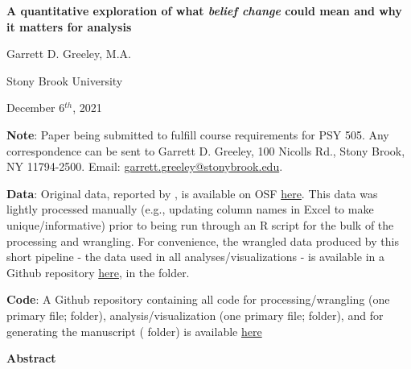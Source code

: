 \documentclass[12pt]{article}  %
\begin{document}
\begin{center}
    \vspace*{4cm}
    
    \textbf{A quantitative exploration of what \textit{belief change} could mean and why it matters for analysis}
    
    \vspace{1cm}
    Garrett D. Greeley, M.A.
    
    \vspace{0.5cm}
    Stony Brook University
    
    \vspace{0.5cm}
    December 6$^{th}$, 2021
\end{center}

\vspace{7cm}

\singlespacing

\textbf{Note}: Paper being submitted to fulfill course requirements for PSY 505. Any correspondence can be sent to Garrett D. Greeley, 100 Nicolls Rd., Stony Brook, NY 11794-2500. Email: \href{garrett.greeley@stonybrook.edu}{garrett.greeley@stonybrook.edu}.

\textbf{Data}: Original data, reported by \textcite{vlasceanu_synchronization_2020}, is available on OSF \href{https://osf.io/8vjym/}{here}. This data was lightly processed manually (e.g., updating column names in Excel to make unique/informative) prior to being run through an R script for the bulk of the processing and wrangling. For convenience, the wrangled data produced by this short pipeline - the data used in all analyses/visualizations - is available in a Github repository \href{https://github.com/ggreeley/belief_synch_reanalysis_505/tree/dev}{here}, in the  folder.

\textbf{Code}: A Github repository containing all code for processing/wrangling (one primary file;  folder), analysis/visualization (one primary file;  folder), and for generating the manuscript ( folder) is available \href{https://github.com/ggreeley/belief_synch_reanalysis_505/tree/dev}{here}


\newpage

\doublespacing

\begin{center}
\textbf{Abstract}
\end{center}

\end{document}
